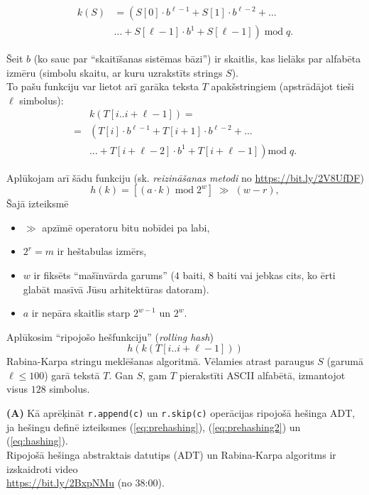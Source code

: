\documentclass[a4paper]{article}
\begin{document}
{\small
\begin{align}
k(S) & = \left(S[0]\cdot{}b^{\ell-1} + S[1] \cdot b^{\ell-2} + \ldots  \right. \nonumber \\
     & \left. \ldots + S[\ell - 1] \cdot b^1 + S[\ell - 1]\right)\;\text{mod}\;q.  \label{eq:prehashing}
\end{align}
} 

Šeit $b$ (ko sauc par ``skaitīšanas sistēmas bāzi'') ir skaitlis, kas lielāks par alfabēta izmēru (simbolu skaitu, 
ar kuru uzrakstīts strings $S$).\\
To pašu funkciju var lietot arī garāka teksta $T$ apakšstringiem (apstrādājot tieši $\ell$ simbolus): 
{\small
\begin{align}
  & k(T[i..i+\ell-1]) = \nonumber \\
= & \left(T[i]\cdot{}b^{\ell-1} + T[i+1] \cdot b^{\ell-2} + \right. \ldots  \nonumber \\
  & \left. \ldots + T[i + \ell{} - 2] \cdot b^{1} + T[i + \ell{} - 1]\right) \text{mod}\;q. \label{eq:prehashing2} 
\end{align}
}

Aplūkojam arī šādu funkciju (sk. {\em reizināšanas metodi} no \url{https://bit.ly/2V8UfDF})
\begin{equation}
\label{eq:hashing}
h(k) = \left[ (a \cdot k)\;\text{mod}\;2^w \right]\;\gg\;(w - r),
\end{equation}
Šajā izteiksmē
\begin{itemize}
\item $\gg$ apzīmē operatoru bitu nobīdei pa labi,
\item $2^r = m$ ir heštabulas izmērs,
\item $w$ ir fiksēts ``mašīnvārda garums'' ($4$ baiti, $8$ baiti vai jebkas cits, ko ērti glabāt masīvā Jūsu arhitektūras datoram).
\item $a$ ir nepāra skaitlis starp $2^{w-1}$ un $2^w$.
\end{itemize}

Aplūkosim ``ripojošo hešfunkciju'' ({\em rolling hash}) 
$$h(k(T[i..i+\ell-1]))$$
Rabina-Karpa stringu meklēšanas algoritmā.
Vē\-la\-mies atrast paraugus $S$ (garumā $\ell \leq 100$) garā tekstā $T$.
Gan $S$, gam $T$ pierakstīti ASCII alfabētā, izmantojot visus $128$ simbolus.

{\bf (A)} Kā aprēķināt {\tt r.append(c)} un {\tt r.skip(c)}
operācijas ripojošā hešinga ADT, ja hešingu definē izteiksmes (\ref{eq:prehashing}), (\ref{eq:prehashing2}) un (\ref{eq:hashing}).\\
Ripojošā hešinga abstraktais datutips (ADT) un Rabina-Karpa algoritms ir izskaidroti 
video\\ \url{https://bit.ly/2BxpNMu} (no 38:00).
\end{document}
